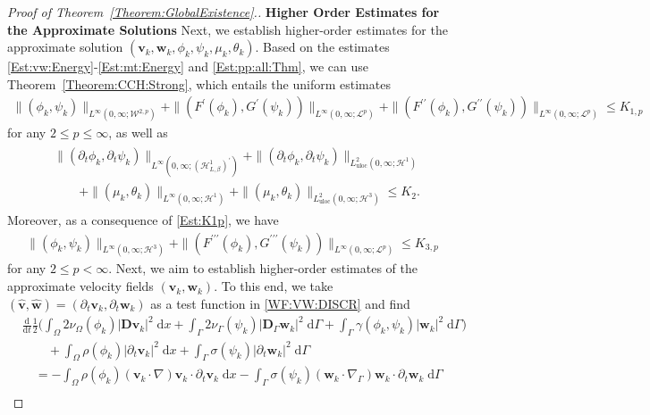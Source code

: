 \documentclass[10pt,reqno]{amsart}
\theoremstyle{remark}
\numberwithin{equation}{section}
\newcommand{\abs}[1]{| #1 |}
\newcommand{\norm}[1]{\| #1 \|}
\newcommand{\bv}{\mathbf{v}}
\newcommand{\bw}{\mathbf{w}}
\newcommand{\ww}{\widehat{\bw}}
\newcommand{\wv}{\widehat{\bv}}
\newcommand{\D}{\mathbf{D}}
\newcommand{\Dg}{\mathbf{D}_\Gamma}
\newcommand{\intO}{\int_\Omega}
\newcommand{\intG}{\int_\Gamma}
\newcommand{\dx}{\;\mathrm{d}x}
\newcommand{\dG}{\;\mathrm d\Ga}
\newcommand{\ddt}{\frac{\mathrm d}{\mathrm dt}}
\newcommand{\delt}{\partial_{t}}
\newcommand{\Grad}{\nabla}
\newcommand{\Gradg}{\nabla_\Ga}
\newcommand{\Om}{\Omega}
\newcommand{\Ga}{\Gamma}
\begin{document}
\begin{proof}[Proof of Theorem~\ref{Theorem:GlobalExistence}.]
\textbf{Higher Order Estimates for the Approximate Solutions}
Next, we establish higher-order estimates for the approximate solution $(\bv_k,\bw_k,\phi_k,\psi_k,\mu_k,\theta_k)$. Based on the estimates \eqref{Est:vw:Energy}-\eqref{Est:mt:Energy} and \eqref{Est:pp:all:Thm}, we can use Theorem~\ref{Theorem:CCH:Strong}, which entails the uniform estimates
\begin{align}\label{Est:K1p}
    \norm{(\phi_k,\psi_k)}_{L^\infty(0,\infty;\mathcal{W}^{2,p})} + \norm{(F^\prime(\phi_k),G^\prime(\psi_k))}_{L^\infty(0,\infty;\mathcal{L}^p)} + \norm{(F^{\prime\prime}(\phi_k),G^{\prime\prime}(\psi_k))}_{L^\infty(0,\infty;\mathcal{L}^p)} \leq K_{1,p}
\end{align}
for any $2 \leq p \leq \infty$, as well as
\begin{align}\label{Est:K2}
    \begin{split}
        &\norm{(\delt\phi_k,\delt\psi_k)}_{L^\infty(0,\infty;(\mathcal{H}^1_{L,\beta})^\prime)} + \norm{(\delt\phi_k,\delt\psi_k)}_{L^2_{\mathrm{uloc}}(0,\infty;\mathcal{H}^1)} \\
        &\qquad + \norm{(\mu_k,\theta_k)}_{L^\infty(0,\infty;\mathcal{H}^1)} + \norm{(\mu_k,\theta_k)}_{L^2_{\mathrm{uloc}}(0,\infty;\mathcal{H}^3)} \leq K_2.
    \end{split}
\end{align}
Moreover, as a consequence of \eqref{Est:K1p}, we have
\begin{align}\label{Est:K3}
    \norm{(\phi_k,\psi_k)}_{L^\infty(0,\infty;\mathcal{H}^3)} + \norm{(F^{\prime\prime\prime}(\phi_k),G^{\prime\prime\prime}(\psi_k))}_{L^\infty(0,\infty;\mathcal{L}^p)} \leq  K_{3,p}
\end{align}
for any $2 \leq p < \infty$. Next, we aim to establish higher-order estimates of the approximate velocity fields $(\bv_k,\bw_k)$. To this end, we take $(\wv,\ww) = (\delt\bv_k,\delt\bw_k)$ as a test function in \eqref{WF:VW:DISCR} and find
\begin{align}\label{Est:H_k:-1}
    &\ddt\frac12\Big(\intO 2\nu_\Om(\phi_k)\abs{\D\bv_k}^2\dx + \intG 2\nu_\Ga(\psi_k)\abs{\Dg\bw_k}^2\dG + \intG \gamma(\phi_k,\psi_k)\abs{\bw_k}^2\dG\Big) \nonumber \\
    &\qquad + \intO \rho(\phi_k)\abs{\delt\bv_k}^2\dx + \intG \sigma(\psi_k)\abs{\delt\bw_k}^2\dG \nonumber \\
    &\quad = - \intO \rho(\phi_k)(\bv_k\cdot\Grad)\bv_k\cdot\delt\bv_k\dx - \intG \sigma(\psi_k)(\bw_k\cdot\Gradg)\bw_k\cdot\delt\bw_k\dG \nonumber \\

\end{align}
\end{proof}
\end{document}
